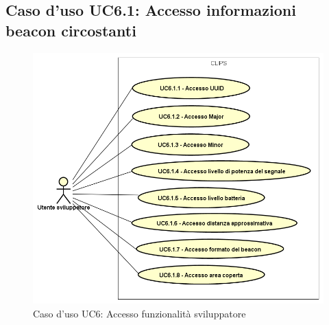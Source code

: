 \documentclass[../AnalisiDeiRequisiti.tex]{subfiles}
\begin{document}
\subsection{Caso d'uso UC6.1: Accesso informazioni beacon circostanti}
\begin{figure}[!h]
            \centering
            \includegraphics[scale=0.95, width=\textwidth]{img/UC6-1.png}
            \caption{Caso d'uso UC6: Accesso funzionalità sviluppatore}\label{fig:UC6} 
        \end{figure}
\end{document}
